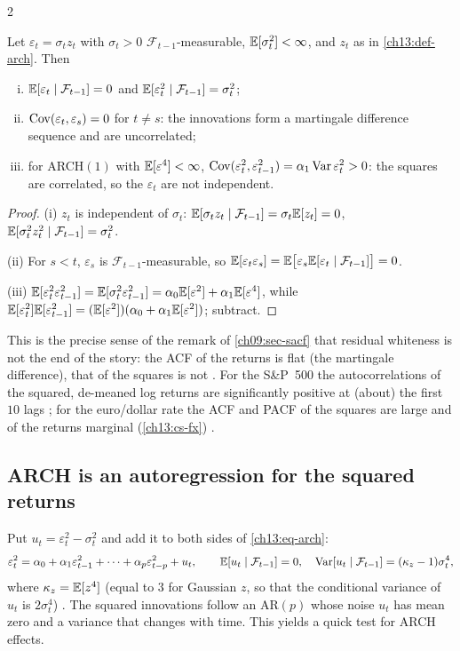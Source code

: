 \begin{paracol}{2}
\begin{proposition}\label{ch13:prop-mds}
Let $\varepsilon_t=\sigma_tz_t$ with $\sigma_t>0$ $\mathcal F_{t-1}$-measurable, $\mathbb{E}[\sigma_t^2]<\infty$, and $z_t$ as in \cref{ch13:def-arch}. Then
\begin{enumerate}[(i)]
  \item $\mathbb{E}[\varepsilon_t\mid\mathcal F_{t-1}]=0$ and $\mathbb{E}[\varepsilon_t^2\mid\mathcal F_{t-1}]=\sigma_t^2$;
  \item $\operatorname{Cov}(\varepsilon_t,\varepsilon_s)=0$ for $t\ne s$: the innovations form a martingale difference sequence and are uncorrelated;
  \item for ARCH$(1)$ with $\mathbb{E}[\varepsilon^4]<\infty$, $\operatorname{Cov}(\varepsilon_t^2,\varepsilon_{t-1}^2)=\alpha_1\operatorname{Var}\varepsilon_t^2>0$: the squares are correlated, so the $\varepsilon_t$ are not independent.
\end{enumerate}
\end{proposition}
\begin{proof}
(i) $z_t$ is independent of $\sigma_t$: $\mathbb{E}[\sigma_tz_t\mid\mathcal F_{t-1}]=\sigma_t\mathbb{E}[z_t]=0$, $\mathbb{E}[\sigma_t^2z_t^2\mid\mathcal F_{t-1}]=\sigma_t^2$.

(ii) For $s<t$, $\varepsilon_s$ is $\mathcal F_{t-1}$-measurable, so $\mathbb{E}[\varepsilon_t\varepsilon_s]=\mathbb{E}\bigl[\varepsilon_s\mathbb{E}[\varepsilon_t\mid\mathcal F_{t-1}]\bigr]=0$.

(iii) $\mathbb{E}[\varepsilon_t^2\varepsilon_{t-1}^2]=\mathbb{E}[\sigma_t^2\varepsilon_{t-1}^2]=\alpha_0\mathbb{E}[\varepsilon^2]+\alpha_1\mathbb{E}[\varepsilon^4]$, while $\mathbb{E}[\varepsilon_t^2]\mathbb{E}[\varepsilon^2_{t-1}]=(\mathbb{E}[\varepsilon^2])(\alpha_0+\alpha_1\mathbb{E}[\varepsilon^2])$; subtract.
\end{proof}
This is the precise sense of the remark of \cref{ch09:sec-sacf} that residual whiteness is not the end of the story: the ACF of the returns is flat (the martingale
difference), that of the squares is not . For the S\&P~500 the autocorrelations of the squared, de-meaned log returns
are significantly positive at (about) the first $10$ lags ; for the euro/dollar rate the ACF and PACF of the squares are large and of the returns marginal
(\cref{ch13:cs-fx}) .

\subsection{ARCH is an autoregression for the squared returns}\label{ch13:sec-arch-ar}
Put $u_t=\varepsilon_t^2-\sigma_t^2$ and add it to both sides of \eqref{ch13:eq-arch}:
\begin{equation}\label{ch13:eq-archar}
  \varepsilon_t^2=\alpha_0+\alpha_1\varepsilon_{t-1}^2+\dots+\alpha_p\varepsilon_{t-p}^2+u_t,\qquad
  \mathbb{E}[u_t\mid\mathcal F_{t-1}]=0,\quad \operatorname{Var}[u_t\mid\mathcal F_{t-1}]=(\kappa_z-1)\sigma_t^4 ,
\end{equation}
where $\kappa_z=\mathbb{E}[z^4]$ (equal to $3$ for Gaussian $z$, so that the conditional variance of $u_t$ is $2\sigma_t^4$)
. The squared innovations follow an AR$(p)$ whose noise $u_t$ has mean zero and a variance that
changes with time. This yields a quick test for ARCH effects.


\end{paracol}
